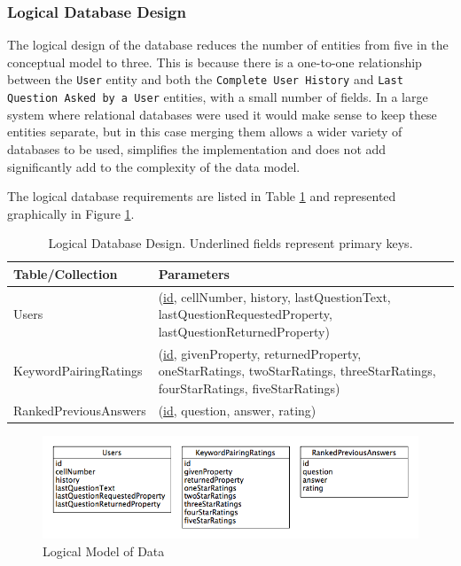 \documentclass[authoryearcitations]{UoYCSproject}
\begin{document}
\subsubsection{Logical Database Design}
The logical design of the database reduces the number of entities from five in the conceptual model to three.  This is because there is a one-to-one relationship between the \texttt{User} entity and both the \texttt{Complete User History} and \texttt{Last Question Asked by a User} entities, with a small number of fields.  In a large system where relational databases were used it would make sense to keep these entities separate, but in this case merging them allows a wider variety of databases to be used, simplifies the implementation and does not add significantly add to the complexity of the data model. %

The logical database requirements are listed in Table \ref{table:logicalDatabaseDesignListing} and represented graphically in Figure \ref{fig:logicalDatabaseDesignDiagram}.

\begin{table}
\begin{center}
    \begin{tabular}{| l | p{6cm} |}
    \hline
    Table/Collection & Parameters \\ \hline
    Users & (\underline{id}, cellNumber, history, lastQuestionText, lastQuestionRequestedProperty, lastQuestionReturnedProperty) \\ \hline
    KeywordPairingRatings & (\underline{id}, givenProperty, returnedProperty, oneStarRatings, twoStarRatings, threeStarRatings, fourStarRatings, fiveStarRatings) \\ \hline
    RankedPreviousAnswers & (\underline{id}, question, answer, rating) \\ \hline
    \end{tabular}
    \caption{Logical Database Design.  Underlined fields represent primary keys.}
    \label{table:logicalDatabaseDesignListing}
\end{center}
\end{table}

\begin{figure}[htb] 
\includegraphics[width=\linewidth]{logicalModel}
\caption{Logical Model of Data}
\label{fig:logicalDatabaseDesignDiagram}
\end{figure}
\end{document}
